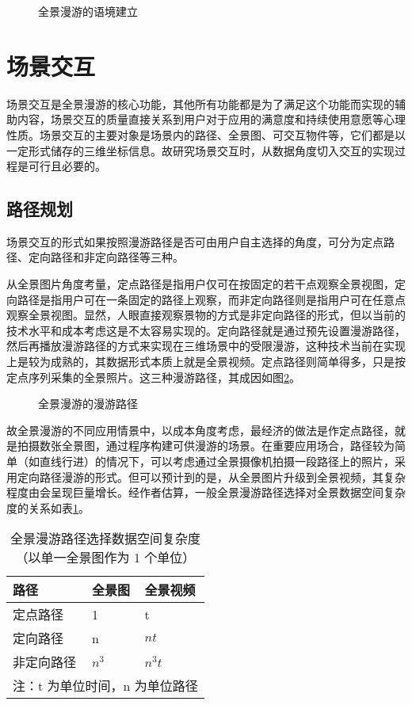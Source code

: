 \begin{figure}[htp]
\centering
{}
\caption{全景漫游的语境建立}
\label{fig:env}
\end{figure}

\section{场景交互}

场景交互是全景漫游的核心功能，其他所有功能都是为了满足这个功能而实现的辅助内容，场景交互的质量直接关系到用户对于应用的满意度和持续使用意愿等心理性质。场景交互的主要对象是场景内的路径、全景图、可交互物件等，它们都是以一定形式储存的三维坐标信息。故研究场景交互时，从数据角度切入交互的实现过程是可行且必要的。

\subsection{路径规划}
场景交互的形式如果按照漫游路径是否可由用户自主选择的角度，可分为定点路径、定向路径和非定向路径等三种。

从全景图片角度考量，定点路径是指用户仅可在按固定的若干点观察全景视图，定向路径是指用户可在一条固定的路径上观察，而非定向路径则是指用户可在任意点观察全景视图。显然，人眼直接观察景物的方式是非定向路径的形式，但以当前的技术水平和成本考虑这是不太容易实现的。定向路径就是通过预先设置漫游路径，然后再播放漫游路径的方式来实现在三维场景中的受限漫游，这种技术当前在实现上是较为成熟的，其数据形式本质上就是全景视频。定点路径则简单得多，只是按定点序列采集的全景照片。这三种漫游路径，其成因如图\ref{fig:visual}。

\begin{figure}[htp]
\centering
{}
\caption{全景漫游的漫游路径}
\label{fig:visual}
\end{figure}

故全景漫游的不同应用情景中，以成本角度考虑，最经济的做法是作定点路径，就是拍摄数张全景图，通过程序构建可供漫游的场景。在重要应用场合，路径较为简单（如直线行进）的情况下，可以考虑通过全景摄像机拍摄一段路径上的照片，采用定向路径漫游的形式。但可以预计到的是，从全景图片升级到全景视频，其复杂程度由会呈现巨量增长。经作者估算，一般全景漫游路径选择对全景数据空间复杂度的关系如表\ref{tab:complex}。

\begin{table}[htbp]
\centering
\caption{全景漫游路径选择数据空间复杂度\newline（以单一全景图作为 1 个单位）}
\vskip 5pt
\begin{tabular}{lll}
\toprule
路径 & 全景图 & 全景视频 \\
\midrule
定点路径 & 1 & t \\
定向路径  & n & $nt$ \\
非定向路径 & $n^3$ & $n^3t$ \\
\bottomrule
\multicolumn{3}{l}{\small 注：t 为单位时间，n 为单位路径}
\end{tabular}
\label{tab:complex}
\end{table}

